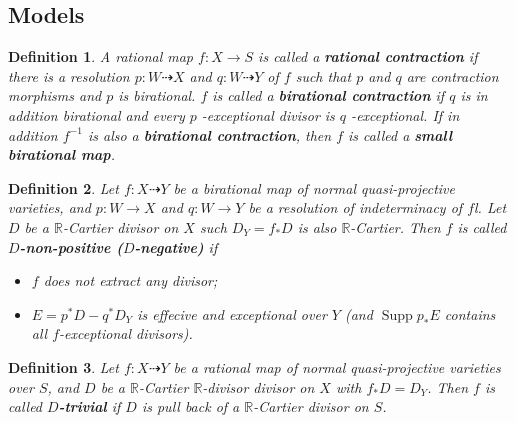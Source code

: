 \documentclass{article}
\newtheorem{defn}{Definition}[subsection]
\begin{document}
\subsection{Models}

\begin{defn}
  A rational map $f:X\to S$ is called a \textbf{rational contraction} if there is a resolution $p:W\dashrightarrow X$  and $q:W\dashrightarrow Y$  of $f$  such that $p$  and $q$  are contraction morphisms and $p$  is birational. $f$ is called a \textbf{birational contraction} if $q$  is in addition birational and every $p$ -exceptional divisor is $q$ -exceptional. If in addition $f^{-1}$ is also a \textbf{birational contraction}, then $f$ is called a \textbf{small birational map}.
\end{defn}

\begin{defn}\label{negativemap}
Let $f:X\dashrightarrow Y$ be a birational map of normal quasi-projective varieties, and $p:W\to X$ and $q:W\to Y$ be a resolution of indeterminacy of $f$l. Let $D$ be a $\mathbb{R}$-Cartier divisor on $X$ such  $D_{Y}=f_*D$ is  also $\mathbb{R}$-Cartier. Then $f$ is called \textbf{$D$-non-positive ($D$-negative)} if
\begin{itemize}
  \item $f$ does not extract any divisor;
  \item $E=p^{*}D-q^*D_Y$ is effecive and exceptional over $Y$ (and $\operatorname{Supp}p_*E$ contains all $f$-exceptional divisors).
\end{itemize}
\end{defn}
\begin{defn}\label{trivialmap}
  Let $f:X\dashrightarrow Y$ be a rational map of normal quasi-projective varieties over $S$, and $D$ be a $\mathbb{R}$-Cartier $\mathbb{R}$-divisor divisor on $X$ with $f_*D=D_Y$. Then $f$ is called \textbf{$D$-trivial} if $D$ is pull back of a $\mathbb{R}$-Cartier divisor on $S$.
\end{defn}
\end{document}

